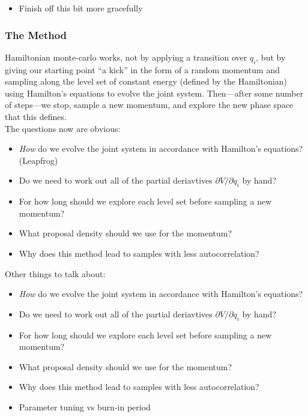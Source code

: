 \documentclass[11pt]{report}
\begin{document}
\begin{itemize}
  \item Finish off this bit more gracefully
\end{itemize}

\subsubsection{The Method}
Hamiltonian monte-carlo works, not by applying a transition over $q_i$, but by giving our starting point ``a kick'' in the form of a random momentum and sampling along the level set of constant energy (defined by the Hamiltonian) using Hamilton's equations to evolve the joint system. Then---after some number of steps---we stop, sample a new momentum, and explore the new phase space that this defines. \\

The questions now are obvious:

\begin{itemize}
\item \emph{How} do we evolve the joint system in accordance with Hamilton's equations? (Leapfrog)
\item Do we need to work out all of the partial deriavtives $\partial V/\partial q_i$ by hand? 
\item For how long should we explore each level set before sampling a new momentum?
\item What proposal density should we use for the momentum?
\item Why does this method lead to samples with less autocorrelation?
\end{itemize}

Other things to talk about:
\begin{itemize}
\item \emph{How} do we evolve the joint system in accordance with Hamilton's equations?
\item Do we need to work out all of the partial deriavtives $\partial V/\partial q_i$ by hand? 
\item For how long should we explore each level set before sampling a new momentum?
\item What proposal density should we use for the momentum?
\item Why does this method lead to samples with less autocorrelation?
\item Parameter tuning vs burn-in period
\end{itemize}
\end{document}
